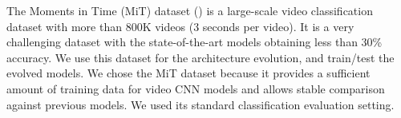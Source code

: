 \documentclass{article} \usepackage{iclr2020_conference,times}
\begin{document}
The Moments in Time (MiT) dataset (\citealp{monfort2018moments}) is a large-scale video classification dataset with more than 800K videos (3 seconds per video). It is a very challenging dataset with the state-of-the-art models obtaining less than 30\% accuracy. We use this dataset for the architecture evolution, and train/test the evolved models. We chose the MiT dataset because it provides a sufficient amount of training data for video CNN models and allows stable comparison against previous models. We used its standard classification evaluation setting.
\end{document}
